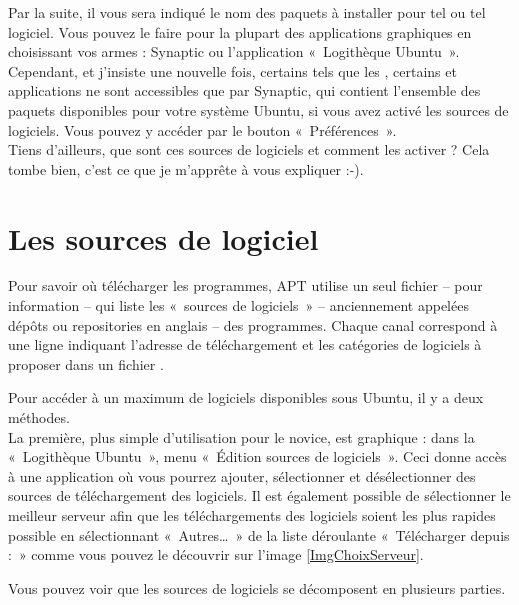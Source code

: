 \begin{nota}
Par la suite, il vous sera indiqué le nom des paquets à installer pour tel ou tel logiciel. Vous pouvez le faire pour la plupart des applications graphiques en choisissant vos armes : Synaptic ou l'application «~Logithèque Ubuntu~». Cependant, et j'insiste une nouvelle fois, certains  tels que les  , certains  et applications ne sont accessibles que par Synaptic, qui contient l'ensemble des paquets disponibles pour votre système Ubuntu, si vous avez activé les sources de logiciels. Vous pouvez y accéder par le bouton «~Préférences~».\\
Tiens d'ailleurs, que sont ces sources de logiciels et comment les activer ? Cela tombe bien, c'est ce que je m'apprête à vous expliquer :-).
\end{nota}
\section{Les sources de logiciel}
\label{RefSourceMAJ}
Pour savoir où télécharger les programmes, APT utilise un seul fichier --  pour information -- qui liste les «~sources de logiciels~» -- anciennement appelées dépôts ou repositories en anglais -- des programmes. Chaque canal correspond à une ligne indiquant l'adresse de téléchargement et les catégories de logiciels à proposer dans un fichier .\par
Pour accéder à un maximum de logiciels disponibles sous Ubuntu, il y a deux méthodes.\\
La première, plus simple d'utilisation pour le novice, est graphique : dans la «~Logithèque Ubuntu~», menu «~Édition  \FlecheDroite sources de logiciels~». Ceci donne accès à une application où vous pourrez ajouter, sélectionner et désélectionner des sources de téléchargement des logiciels. Il est également possible de sélectionner le meilleur serveur afin que les téléchargements des logiciels soient les plus rapides possible en sélectionnant «~Autres\ldots{}~» de la liste déroulante «~Télécharger depuis :~» comme vous pouvez le découvrir sur l'image \ref{ImgChoixServeur}.\par
{}
Vous pouvez voir que les sources de logiciels se décomposent en plusieurs parties.
